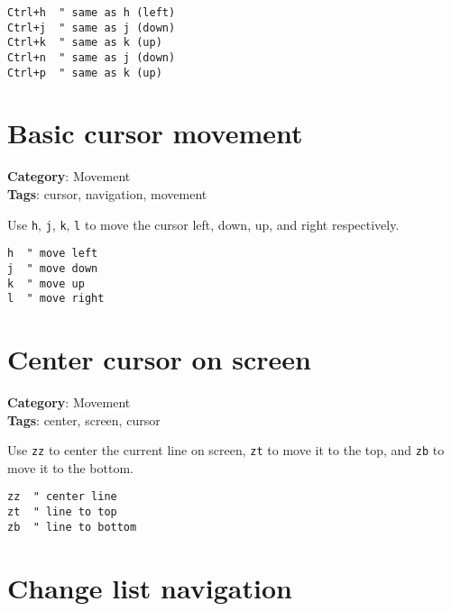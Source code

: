 {{{{{{\begin{Exa*}{}
\begin{Verbatim}[fontsize=\footnotesize, breaklines, breakanywhere]
Ctrl+h  " same as h (left)
Ctrl+j  " same as j (down)  
Ctrl+k  " same as k (up)
Ctrl+n  " same as j (down)
Ctrl+p  " same as k (up)
\end{Verbatim}
\end{Exa*}

\section{Basic cursor movement}

\textbf{Category}: Movement\\ \textbf{Tags}: cursor, navigation, movement
\vspace{0.5cm}

Use {\footnotesize \Verb§h§}, {\footnotesize \Verb§j§}, {\footnotesize \Verb§k§}, {\footnotesize \Verb§l§} to move the cursor left, down, up, and right respectively.

\begin{Exa*}{}
\begin{Verbatim}[fontsize=\footnotesize, breaklines, breakanywhere]
h  " move left
j  " move down
k  " move up
l  " move right
\end{Verbatim}
\end{Exa*}

\section{Center cursor on screen}

\textbf{Category}: Movement\\ \textbf{Tags}: center, screen, cursor
\vspace{0.5cm}

Use {\footnotesize \Verb§zz§} to center the current line on screen, {\footnotesize \Verb§zt§} to move it to the top, and {\footnotesize \Verb§zb§} to move it to the bottom.

\begin{Exa*}{}
\begin{Verbatim}[fontsize=\footnotesize, breaklines, breakanywhere]
zz  " center line
zt  " line to top
zb  " line to bottom
\end{Verbatim}
\end{Exa*}

\section{Change list navigation}

}}}}}}
